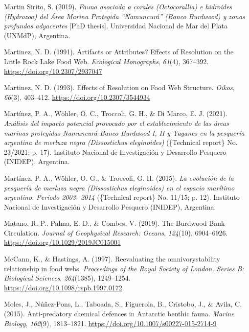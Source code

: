 \documentclass[preprint, 3p,
authoryear]{elsarticle} %
\newlength{\cslhangindent}
\newlength{\cslentryspacingunit} %
\newenvironment{CSLReferences}[2] %
 {%
  \setlength{\parindent}{0pt}
  \ifodd #1
  \let\oldpar\par
  \def\par{\hangindent=\cslhangindent\oldpar}
  \fi
  \setlength{\parskip}{#2\cslentryspacingunit}
 }%
 {}
\begin{document}
\begin{CSLReferences}{1}{0}
\leavevmode{}%
Martin Sirito, S. (2019). \emph{{Fauna asociada a corales (Octocorallia)
e hidroides (Hydrozoa) del Área Marina Protegida {``Namuncurá''} (Banco
Burdwood) y zonas profundas adyacentes}} {[}PhD thesis{]}. Universidad
Nacional de Mar del Plata (UNMdP), Argentina.

\leavevmode{}%
Martinez, N. D. (1991). Artifacts or {Attributes}? {Effects} of
{Resolution} on the {Little Rock Lake Food Web}. \emph{Ecological
Monographs}, \emph{61}(4), 367--392.
\url{https://doi.org/10.2307/2937047}

\leavevmode{}%
Martinez, N. D. (1993). Effects of {Resolution} on {Food Web Structure}.
\emph{Oikos}, \emph{66}(3), 403--412.
\url{https://doi.org/10.2307/3544934}

\leavevmode{}%
Martínez, P. A., Wöhler, O. C., Troccoli, G. H., \& Di Marco, E. J.
(2021). \emph{{Análisis del impacto potencial provocado por el
establecimiento de las áreas marinas protegidas Namuncurá-Banco Burdwood
I, II y Yaganes en la pesquería argentina de merluza negra (Dissostichus
eleginoides)}} (\{Technical report\} No. 23/2021; p. 17). {Instituto
Nacional de Investigación y Desarrollo Pesquero (INIDEP), Argentina}.

\leavevmode{}%
Martínez, P. A., Wöhler, O. G., \& Troccoli, G. H. (2015). \emph{{La
evolución de la pesquería de merluza negra (Dissostichus eleginoides) en
el espacio marítimo argentino. Periodo 2003- 2014}} (\{Technical
report\} No. 11/15; p. 12). {Instituto Nacional de Investigación y
Desarrollo Pesquero (INIDEP), Argentina}.

\leavevmode{}%
Matano, R. P., Palma, E. D., \& Combes, V. (2019). The {Burdwood Bank
Circulation}. \emph{Journal of Geophysical Research: Oceans},
\emph{124}(10), 6904--6926. \url{https://doi.org/10.1029/2019JC015001}

\leavevmode{}%
McCann, K., \& Hastings, A. (1997). Re\textendash evaluating the
omnivory\textendash stability relationship in food webs.
\emph{Proceedings of the Royal Society of London. Series B: Biological
Sciences}, \emph{264}(1385), 1249--1254.
\url{https://doi.org/10.1098/rspb.1997.0172}

\leavevmode{}%
Moles, J., Núñez-Pons, L., Taboada, S., Figuerola, B., Cristobo, J., \&
Avila, C. (2015). Anti-predatory chemical defences in {Antarctic}
benthic fauna. \emph{Marine Biology}, \emph{162}(9), 1813--1821.
\url{https://doi.org/10.1007/s00227-015-2714-9}


\end{CSLReferences}
\end{document}
